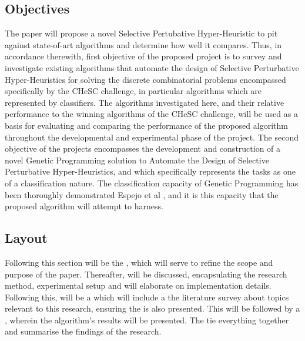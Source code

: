 \documentclass[a4paper,12pt]{article}
\begin{document}
    \subsection{Objectives}
        \par{ 
            \noindent 
            The paper will propose a novel Selective Pertubative Hyper-Heuristic to pit against
            state-of-art algorithms and determine how well it compares. Thus, in accordance therewith, first 
            objective of the proposed project is to survey and investigate existing
            algorithms that automate the design of Selective Perturbative Hyper-Heuristics
            for solving the discrete combinatorial problems encompassed specifically by the
            CHeSC challenge, in particular algorithms which are represented by classifiers.
            The algorithms investigated here, and their relative performance to the winning
            algorithms of the CHeSC challenge, will be used as a basis for evaluating and
            comparing the performance of the proposed algorithm throughout the developmental 
            and experimental phase of the project.\newline 
            \newline 
            The second objective of the projects encompasses the development and construction of a novel 
            Genetic Programming solution to Automate the Design of Selective Perturbative Hyper-Heuristics, 
            and which specifically represents the tasks as one of a classification nature. The classification 
            capacity of Genetic Programming has been thoroughly demonstrated Espejo et al \cite{sgpc}, and it
            is this capacity that the proposed algorithm will attempt to harness.
        }
    \subsection{Layout}
        \par{
            \noindent
            Following this section will be the , which will serve to refine the scope and purpose of the paper.
            Thereafter,   will be discussed, encapsulating the research method, experimental setup and 
            will elaborate on implementation details. Following this, will be a  which will include a the 
            literature survey about topics relevant to this research, ensuring the  is also presented. This will 
            be followed by a , wherein the algorithm's results will be presented. The 
            tie everything together and summarise the findings of the research.
        }
\end{document}

